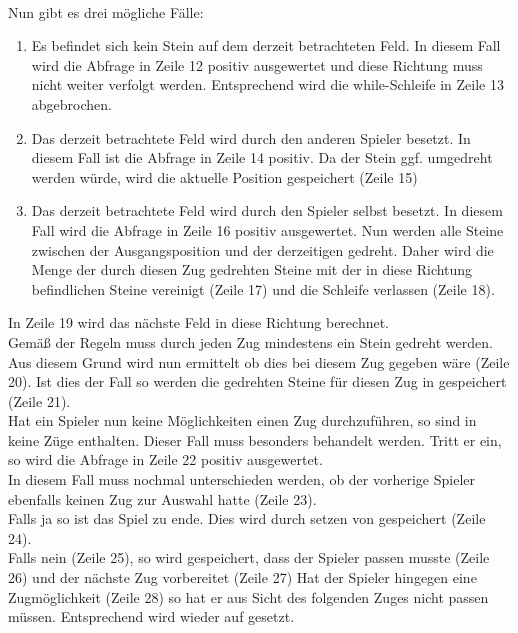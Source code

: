 \\Nun gibt es drei mögliche Fälle:
\begin{enumerate}
\setcounter{enumi}{0}
\item Es befindet sich kein Stein auf dem derzeit betrachteten Feld. In diesem Fall wird die Abfrage in Zeile 12 positiv ausgewertet und diese Richtung muss nicht weiter verfolgt werden. Entsprechend wird die while-Schleife in Zeile 13 abgebrochen.
\item Das derzeit betrachtete Feld wird durch den anderen Spieler besetzt. In diesem Fall ist die Abfrage in Zeile 14 positiv. Da der Stein ggf. umgedreht werden würde, wird die aktuelle Position gespeichert (Zeile 15)
\item Das derzeit betrachtete Feld wird durch den Spieler selbst besetzt. In diesem Fall wird die Abfrage in Zeile 16 positiv ausgewertet. Nun werden alle Steine zwischen der Ausgangsposition und der derzeitigen gedreht. Daher wird die Menge der durch diesen Zug gedrehten Steine mit der in diese Richtung befindlichen Steine vereinigt (Zeile 17) und die Schleife verlassen (Zeile 18).
\end{enumerate}
In Zeile 19 wird das nächste Feld in diese Richtung berechnet.
\\Gemäß der Regeln muss durch jeden Zug mindestens ein Stein gedreht werden. Aus diesem Grund wird nun ermittelt ob dies bei diesem Zug gegeben wäre (Zeile 20). Ist dies der Fall so werden die gedrehten Steine für diesen Zug in  gespeichert (Zeile 21).
\\Hat ein Spieler nun keine Möglichkeiten einen Zug durchzuführen, so sind in  keine Züge enthalten. Dieser Fall muss besonders behandelt werden. Tritt er ein, so wird die Abfrage in Zeile 22 positiv ausgewertet.
\\In diesem Fall muss nochmal unterschieden werden, ob der vorherige Spieler ebenfalls keinen Zug zur Auswahl hatte (Zeile 23).
\\Falls ja so ist das Spiel zu ende. Dies wird durch setzen von  gespeichert (Zeile 24).
\\Falls nein (Zeile 25), so wird gespeichert, dass der Spieler passen musste (Zeile 26) und der nächste Zug vorbereitet (Zeile 27)
Hat der Spieler hingegen eine Zugmöglichkeit (Zeile 28) so hat er aus Sicht des folgenden Zuges nicht passen müssen. Entsprechend wird  wieder auf  gesetzt. 
